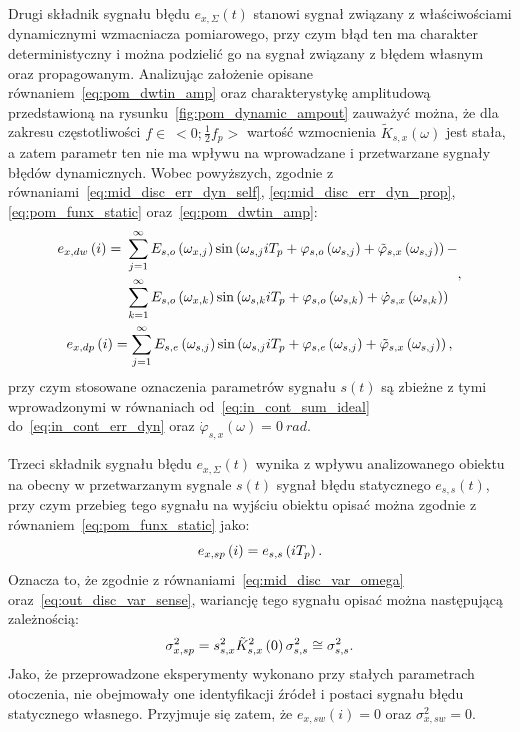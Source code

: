 Drugi składnik sygnału błędu $e_{x,\Sigma}(t)$ stanowi sygnał związany z właściwościami dynamicznymi wzmacniacza pomiarowego, przy czym błąd ten ma charakter deterministyczny i można podzielić go na sygnał związany z błędem własnym oraz propagowanym. Analizując założenie opisane równaniem~\eqref{eq:pom_dwtin_amp} oraz charakterystykę amplitudową przedstawioną na rysunku~\ref{fig:pom_dynamic_ampout} zauważyć można, że dla zakresu częstotliwości $f \in~<0; \frac{1}{2} f_{p}>$ wartość wzmocnienia $\tilde{K}_{s,x}(\omega)$ jest stała, a zatem parametr ten nie ma wpływu na wprowadzane i przetwarzane sygnały błędów dynamicznych. Wobec powyższych, zgodnie z równaniami~\eqref{eq:mid_disc_err_dyn_self}, \eqref{eq:mid_disc_err_dyn_prop}, \eqref{eq:pom_funx_static} oraz~\eqref{eq:pom_dwtin_amp}:
\begin{gather}
\begin{split}
e_{x,dw} \left(i\right) =~
& \sum _{j = 1} ^{\infty} E_{s,o} \left(\omega_{x,j}\right) \sin \left( \omega_{s,j} iT_{p} + \varphi_{s,o} \left(\omega_{s,j}\right) + \tilde{\varphi}_{s,x} \left(\omega_{s,j}\right) \right) - \\
& \sum _{k = 1} ^{\infty} E_{s,o} \left(\omega_{x,k}\right) \sin \left( \omega_{s,k} iT_{p} + \varphi_{s,o} \left(\omega_{s,k}\right) + \dot{\varphi}_{s,x} \left(\omega_{s,k}\right) \right)
\end{split}
\label{eq:pom_errx_dyn_self}, \\
e_{x,dp} \left(i\right) = \sum _{j = 1} ^{\infty} E_{s,e} \left(\omega_{s,j}\right) \sin \left( \omega_{s,j} iT_{p} + \varphi_{s,e} \left(\omega_{s,j}\right) + \tilde{\varphi}_{s,x} \left(\omega_{s,j}\right) \right) \label{eq:pom_errx_dyn_prop},
\end{gather}
przy czym stosowane oznaczenia parametrów sygnału $s(t)$ są zbieżne z tymi wprowadzonymi w równaniach od~\eqref{eq:in_cont_sum_ideal} do~\eqref{eq:in_cont_err_dyn} oraz $\dot{\varphi}_{s,x}(\omega) = \qty{0}{rad}$.

Trzeci składnik sygnału błędu $e_{x,\Sigma}(t)$ wynika z wpływu analizowanego obiektu na obecny w przetwarzanym sygnale $s(t)$ sygnał błędu statycznego $e_{s,s}(t)$, przy czym przebieg tego sygnału na wyjściu obiektu opisać można zgodnie z równaniem~\eqref{eq:pom_funx_static} jako:
\begin{equation}
e_{x,sp} \left(i\right) = e_{s,s} \left(i T_{p}\right) \label{eq:pom_errx_stat_prop}.
\end{equation}
Oznacza to, że zgodnie z równaniami~\eqref{eq:mid_disc_var_omega} oraz~\eqref{eq:out_disc_var_sense}, wariancję tego sygnału opisać można następującą zależnością:
\begin{equation}
\sigma_{x,sp}^{2} = s_{s,x}^{2} \tilde{K}_{s,x}^{2} \left(0\right) \sigma_{s,s}^{2} \cong \sigma_{s,s}^{2} \label{eq:pom_varx_stat_prop}.
\end{equation}
Jako, że przeprowadzone eksperymenty wykonano przy stałych parametrach otoczenia, nie obejmowały one identyfikacji źródeł i postaci sygnału błędu statycznego własnego. Przyjmuje się zatem, że $e_{x,sw}(i) = 0$ oraz $\sigma_{x,sw}^{2} = 0$.


